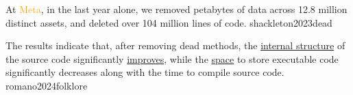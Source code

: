 \documentclass{article}
\begin{document}

  {At \textcolor{orange}{Meta}, in the last year alone, we removed petabytes of data across 12.8 million distinct assets, and deleted over 104 million lines of code.}
  {shackleton2023dead}

  {The results indicate that, after removing dead methods, the \ul{internal structure} of the source code significantly \ul{improves}, while the \ul{space} to store executable code significantly decreases along with the time to compile source code.}
  {romano2024folklore}
\end{document}
